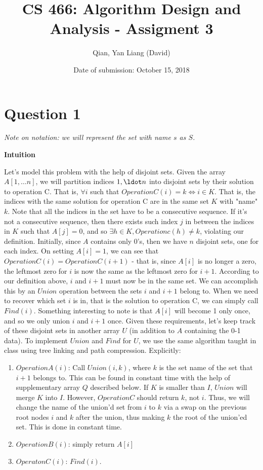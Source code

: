 \documentclass{article}
\title{CS 466: Algorithm Design and Analysis - Assigment 3}
\author{Qian, Yan Liang (David)}
\date{Date of submission: October 15, 2018}
\begin{document}
\newpage

\section{Question 1}

\textit{Note on notation: we will represent the set with name $s$ as $S$.}

\textbf{Intuition}

Let's model this problem with the help of disjoint sets. Given the array $A[1, \ldots n]$, we will
partition indices $1, \ldot n$ into disjoint sets by their solution to operation C. That is, $\forall i$ such that
$OperationC(i) = k \iff i \in K$. That is, the indices with the same solution for operation C are in the same set $K$ with "name" $k$. Note that all the
indices in the set have to be a consecutive sequence. If it's not a consecutive sequence, then there exists such index
$j$ in between the indices in $K$ such that $A[j] = 0$, and so $\exists h \in K,Operationc(h) \neq k$, violating our
definition. Initially, since $A$ contains only 0's, then we have $n$ disjoint sets, one for each index. On setting $A[i]
= 1$, we can see that $OperationC(i) = OperationC(i+1)$ - that is, since $A[i]$ is no longer a zero, the leftmost zero
for $i$ is now the same as the leftmost zero for $i + 1$. According to our definition above, $i$ and $i+1$ must now be
in the same set. We can accomplish this by an $Union$ operation between the sets $i$ and $i+1$ belong to. When we need
to recover which set $i$ is in, that is the solution to operation C, we can simply call $Find(i)$. Something interesting
to note is that $A[i]$ will become 1 only once, and so we only union $i$ and $i+1$ once. Given these requirements, let's
keep track of these disjoint sets in another array $U$ (in addition to $A$ containing the 0-1 data).
To implement $Union$ and $Find$ for $U$, we use the same algorithm taught in class using tree linking and path
compression. Explicitly:

\begin{enumerate}
    \item $OperationA(i)$: Call $Union(i, k)$, where $k$ is the set name of the set that $i + 1$ belongs to. This can be
        found in constant time with the help of supplementary array $Q$ described below. If $K$ is smaller than $I$,
        $Union$ will merge $K$ into $I$. However, $OperationC$ should return $k$, not $i$. Thus, we will change the name
        of the union'd set from $i$ to $k$ via a swap on the previous root nodes $i$ and $k$ after the union, thus
        making $k$ the root of the union'ed set. This is done in constant time.
    \item $OperationB(i)$: simply return $A[i]$
    \item $OperatonC(i)$: $Find(i)$.
\end{enumerate}
\end{document}
